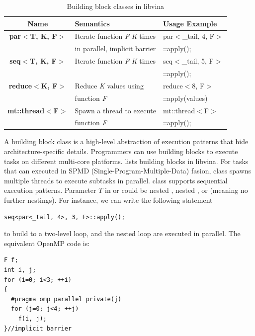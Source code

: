 \begin{table}[hbt]
\caption{Building block classes in libvina}
\begin{tabular}{|c|l|l|}
\hline
Name& Semantics& Usage Example\\
\hline
\textbf{par$<$T, K, F$>$}& Iterate function \textit{F} \textit{K} times &par$<$\_tail, 4, F$>$\\ 
                         &in parallel, implicit barrier                 &::apply();\\                
\hline
\textbf{seq$<$T, K, F$>$}& Iterate function \textit{F} \textit{K} times&seq$<$\_tail, 5, F$>$\\
                         &                                             &::apply();\\
\hline
\textbf{reduce$<$K, F$>$}&Reduce \textit{K} values using &reduce$<$8, F$>$\\
&function
\textit{F}&::apply(values)\\
\hline
\textbf{mt::thread$<$F$>$}&Spawn a thread to execute  & mt::thread$<$F$>$\\
                          &function \textit{F}        & ::apply();\\
\hline
\end{tabular}\label{tbl:bb}
\end{table}

A building block class is a high-level abstraction of execution patterns that
hide architecture-specific details. Programmers can use building blocks to
execute tasks on different multi-core platforms.
 lists building blocks in libvina. For tasks that can
executed in SPMD (Single-Program-Multiple-Data) fasion,  class spawns
multiple threads to execute subtasks in parallel.  class supports
sequential execution patterns. Parameter $T$ in  or  could be nested
, nested , or  (meaning no further nestings).
For instance, we can write the following statement 


\begin{lstlisting}
seq<par<_tail, 4>, 3, F>::apply();
\end{lstlisting}
to build to a two-level loop, and the nested loop are executed in
parallel. The equivalent OpenMP code is:
\begin{lstlisting}
F f;
int i, j;
for (i=0; i<3; ++i)
{
  #pragma omp parallel private(j)
  for (j=0; j<4; ++j) 
    f(i, j);
}//implicit barrier
\end{lstlisting}

